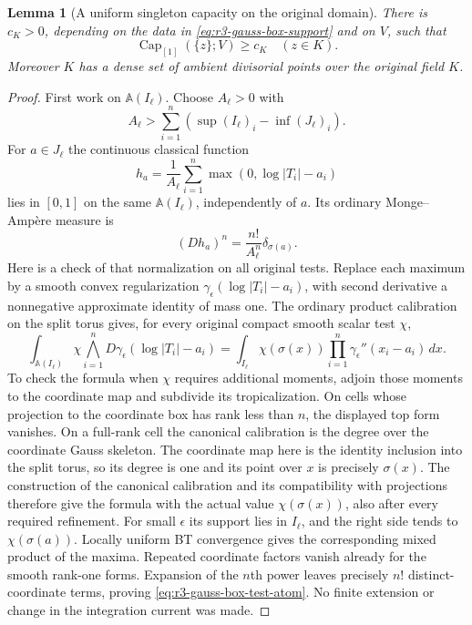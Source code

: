 \documentclass[11pt,a4paper]{article}
\numberwithin{equation}{section}
\newtheorem{lemma}[theorem]{Lemma}
\theoremstyle{definition}
\theoremstyle{remark}
\begin{document}
\begin{lemma}[A uniform singleton capacity on the original domain]
\label{lem:r3-gauss-box-point-capacity}
There is $c_K>0$, depending on the data in
\eqref{eq:r3-gauss-box-support} and on $V$, such that
\[
 \operatorname{Cap}_{[1]}(\{z\};V)\geq c_K
                                      \quad(z\in K).
\]
Moreover $K$ has a dense set of ambient divisorial points over
the original field $K$.
\end{lemma}

\begin{proof}
First work on $\mathbb A(I_\ell)$. Choose $A_\ell>0$ with
\[
 A_\ell>\sum_{i=1}^n
       (\sup (I_\ell)_i-\inf(J_\ell)_i).
\]
For $a\in J_\ell$ the continuous classical function
\[
 h_a=\frac1{A_\ell}\sum_{i=1}^n
                       \max(0,\log|T_i|-a_i)
\]
lies in $[0,1]$ on the same $\mathbb A(I_\ell)$, independently
of $a$. Its ordinary Monge--Amp\`ere measure is
\[
 (Dh_a)^n=\frac{n!}{A_\ell^n}\delta_{\sigma(a)}.
 \tag{10}\label{eq:r3-gauss-box-test-atom}
\]
Here is a check of that normalization on all original tests.
Replace each maximum by a smooth convex regularization
$\gamma_\epsilon(\log|T_i|-a_i)$, with second derivative
a nonnegative approximate identity of mass one. The ordinary
product calibration on the split torus gives, for every
original compact smooth scalar test $\chi$,
\[
 \int_{\mathbb A(I_\ell)}\chi
       \bigwedge_{i=1}^nD\gamma_\epsilon(\log|T_i|-a_i)
  =\int_{I_\ell}\chi(\sigma(x))
       \prod_{i=1}^n\gamma_\epsilon''(x_i-a_i)\,dx.
\]
To check the formula when $\chi$ requires additional moments,
adjoin those moments to the coordinate map and subdivide its
tropicalization. On cells whose projection to the coordinate
box has rank less than $n$, the displayed top form vanishes.
On a full-rank cell the canonical calibration is the degree
over the coordinate Gauss skeleton. The coordinate map here
is the identity inclusion into the split torus, so its degree
is one and its point over $x$ is precisely $\sigma(x)$.
The construction of the canonical calibration and its
compatibility with projections
\cite[\S3.5.1, Lemma~3.5.2, and \S\S3.7--3.8]{CLD12}
therefore give the formula with the actual value
$\chi(\sigma(x))$, also after every required refinement.
For small
$\epsilon$ its support lies in $I_\ell$, and the right side
tends to $\chi(\sigma(a))$. Locally uniform BT convergence
gives the corresponding mixed product of the maxima.
Repeated coordinate factors vanish already for the smooth
rank-one forms. Expansion of the $n$th power leaves precisely
$n!$ distinct-coordinate terms, proving
\eqref{eq:r3-gauss-box-test-atom}. No finite extension or
change in the integration current was made.


\end{proof}
\end{document}
